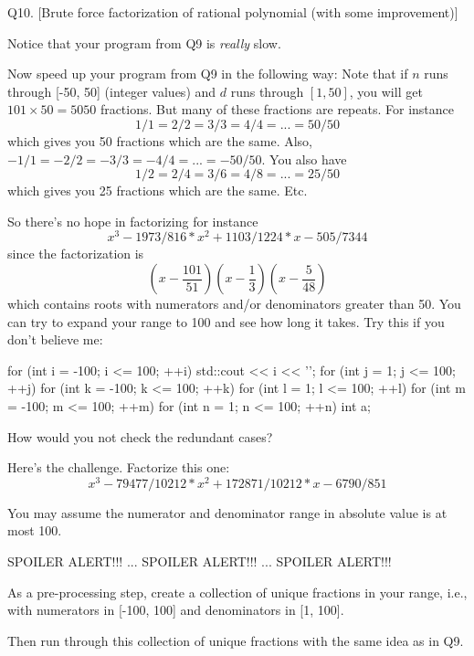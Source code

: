 \newpage
Q10. [Brute force factorization of rational polynomial (with some improvement)]


Notice that your program from Q9 is \textit{really} slow.

Now speed up your program from Q9 in the following way:
Note that if $n$ runs through [-50, 50] (integer values)
and $d$ runs through $[1, 50]$, you will get $101 \times 50=5050$ fractions.
But many of these fractions are repeats.
For instance
\[
  1/1 = 2/2 = 3/3 = 4/4 = ... = 50/50
\]
which gives you 50 fractions which are the same.
Also, $-1/1 = -2/2 = -3/3 = -4/4 = ... = -50/50$. 
You also have
\[
  1/2 = 2/4 = 3/6 = 4/8 = ... = 25/50
\]
which gives you 25 fractions which are the same.
Etc.


So there's no hope in factorizing for instance
\[
x^3 - 1973/816*x^2 + 1103/1224*x - 505/7344
\]
since the factorization is
\[
  \left( x - \frac{101}{51} \right)
  \left( x - \frac{1}{3} \right)
  \left( x - \frac{5}{48} \right)
\]
which contains roots with numerators and/or denominators greater than 50.
You can try to expand your range to 100 and see how long it takes.
Try this if you don't believe me:
\begin{console}[fontsize=\scriptsize]
for (int i = -100; i <= 100; ++i)
{
    std::cout << i << '\n';
    for (int j = 1; j <= 100; ++j)
    {
        for (int k = -100; k <= 100; ++k)
        {
            for (int l = 1; l <= 100; ++l)
            {
                for (int m = -100; m <= 100; ++m)
                {
                    for (int n = 1; n <= 100; ++n)
                    {
                        int a;
                    }
                }
            }
        }
    }
}
\end{console}

How would you not check the redundant cases?


Here's the challenge. Factorize this one:
\[
  x^3 - 79477/10212*x^2 + 172871/10212*x - 6790/851
\]

You may assume the numerator and denominator range in absolute value is at most 100.


\newpage
SPOILER ALERT!!! ... 
SPOILER ALERT!!! ... 
SPOILER ALERT!!!

As a pre-processing step,
create a collection of unique fractions in your range, i.e., with
numerators in [-100, 100]
and denominators in [1, 100].

Then run through this collection of unique fractions with the same
idea as in Q9.

